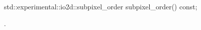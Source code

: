 \begin{itemdecl}
std::experimental::io2d::subpixel_order subpixel_order() const;
\end{itemdecl}
\begin{itemdescr}
	\pnum
	\returns
	.
	
\end{itemdescr}
